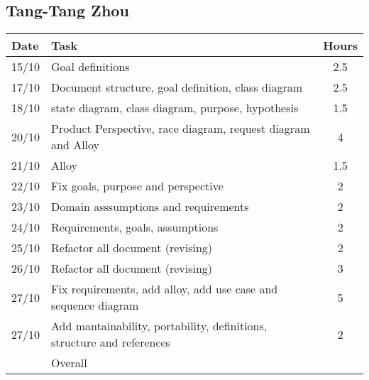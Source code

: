 \subsection{Tang-Tang Zhou}

\begin{table}[H]
\begin{tabularx}{\textwidth}{|l|X|c|}
\hline
\rowcolor[HTML]{C0C0C0} 
Date & Task & Hours\\ \hline
15/10 & Goal definitions & 2.5\\ \hline
17/10 & Document structure, goal definition, class diagram & 2.5\\ \hline
18/10 & state diagram, class diagram, purpose, hypothesis & 1.5\\ \hline
20/10 & Product Perspective, race diagram, request diagram and Alloy & 4\\ \hline
21/10 & Alloy & 1.5 \\ \hline
22/10 & Fix goals, purpose and perspective & 2\\ \hline
23/10 & Domain asssumptions and requirements & 2\\ \hline
24/10 & Requirements, goals, assumptions & 2\\ \hline
25/10 & Refactor all document (revising) & 2\\ \hline
26/10 & Refactor all document (revising) & 3\\ \hline
27/10 & Fix requirements, add alloy, add use case and sequence diagram & 5\\ \hline
27/10 & Add mantainability, portability, definitions, structure and references & 2\\ \hline
\rowcolor[HTML]{C0C0C0} 
& Overall & \\ \hline
\end{tabularx}
\end{table}